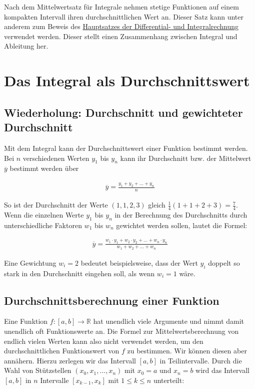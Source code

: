 \documentclass[fontsize=9pt,
               parskip=half-,
               DIV=14,
               listof=chapterentry,
               tocflat]{scrbook}
\begin{document}
Nach dem Mittelwertsatz für Integrale nehmen stetige Funktionen auf einem kompakten Intervall ihren durchschnittlichen Wert an. Dieser Satz kann unter anderem zum Beweis des \href{https://de.wikibooks.org/wiki/Mathe\_für\_Nicht-Freaks:\_Hauptsatz\_der\_Differential-\_und\_Integralrechnung}
{Hauptsatzes der Differential- und Integralrechnung} verwendet werden. Dieser stellt einen Zusammenhang zwischen Integral und Ableitung her.

\section{Das Integral als Durchschnittswert}

\subsection{Wiederholung: Durchschnitt und gewichteter Durchschnitt}

Mit dem Integral kann der Durchschnittswert einer Funktion bestimmt werden. Bei $n$ verschiedenen Werten $y_{1}$ bis $y_{n}$ kann ihr Durchschnitt bzw. der Mittelwert ${\overline {y}}$ bestimmt werden über

\begin{align*}
{\overline {y}}={\frac {y_{1}+y_{2}+\ldots +y_{n}}{n}}
\end{align*}

So ist der Durchschnitt der Werte $(1,1,2,3)$ gleich ${\tfrac {1}{4}}(1+1+2+3)={\tfrac {7}{4}}$. Wenn die einzelnen Werte $y_{1}$ bis $y_{n}$ in der Berechnung des Durchschnitts durch unterschiedliche Faktoren $w_{1}$ bis $w_{n}$ gewichtet werden sollen, lautet die Formel:

\begin{align*}
{\overline {y}}={\frac {w_{1}\cdot y_{1}+w_{2}\cdot y_{2}+\ldots +w_{n}\cdot y_{n}}{w_{1}+w_{2}+\ldots +w_{n}}}
\end{align*}

Eine Gewichtung $w_{i}=2$ bedeutet beispielsweise, dass der Wert $y_{i}$ doppelt so stark in den Durchschnitt eingehen soll, als wenn $w_{i}=1$ wäre.

\subsection{Durchschnittsberechnung einer Funktion}

Eine Funktion $f:[a,b]\to \mathbb {R} $ hat unendlich viele Argumente und nimmt damit unendlich oft Funktionswerte an. Die Formel zur Mittelwertsberechnung von endlich vielen Werten kann also nicht verwendet werden, um den durchschnittlichen Funktionswert von $f$ zu bestimmen. Wir können diesen aber annähern. Hierzu zerlegen wir das Intervall $[a,b]$ in Teilintervalle. Durch die Wahl von Stützstellen $(x_{0},x_{1},\ldots ,x_{n})$ mit $x_{0}=a$ und $x_{n}=b$ wird das Intervall $[a,b]$ in $n$ Intervalle $[x_{k-1},x_{k}]$ mit $1\leq k\leq n$ unterteilt:
\end{document}
